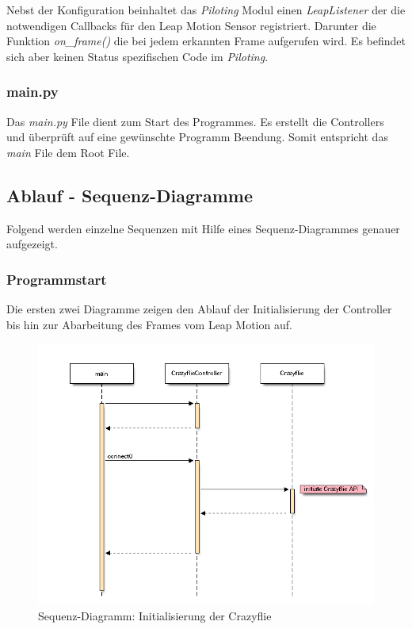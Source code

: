 Nebst der Konfiguration beinhaltet das \textit{Piloting} Modul einen \textit{LeapListener} der die notwendigen Callbacks für den Leap Motion Sensor registriert. Darunter die Funktion \textit{on\_frame()} die bei jedem erkannten Frame aufgerufen wird.
Es befindet sich aber keinen Status spezifischen Code im \textit{Piloting}.

\subsubsection{main.py}
Das \textit{main.py} File dient zum Start des Programmes. Es erstellt die Controllers und überprüft auf eine gewünschte Programm Beendung. Somit entspricht das \textit{main} File dem Root File.

\subsection{Ablauf - Sequenz-Diagramme}
Folgend werden einzelne Sequenzen mit Hilfe eines Sequenz-Diagrammes genauer aufgezeigt.

\subsubsection{Programmstart}
Die ersten zwei Diagramme zeigen den Ablauf der Initialisierung der Controller bis hin zur Abarbeitung des Frames vom Leap Motion auf.
\begin{figure}[H]
	\centering
	\includegraphics[width=1.0\textwidth]{figures/poc/seq_dia_crazyflie.png}
	\caption{Sequenz-Diagramm: Initialisierung der Crazyflie}
\end{figure}

